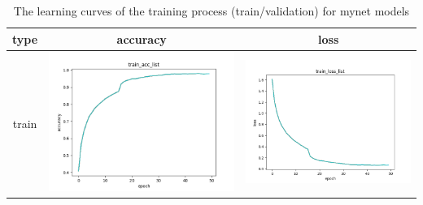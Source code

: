 \documentclass[a4paper, 12pt]{article}
\begin{document}
\begin{table}[!htb]
  \centering
  \caption{The learning curves of the training process (train/validation) for mynet models}
  \begin{tabular}{|c|c|c|}
    \hline
    type  & accuracy                                                                                               & loss                                                                                                    \\
    \hline
    train & \includegraphics[scale=0.5]{p2/experiment/mynet_2024_04_14_21_58_22_sgd_pre_da/log/train_acc_list.png} & \includegraphics[scale=0.5]{p2/experiment/mynet_2024_04_14_21_58_22_sgd_pre_da/log/train_loss_list.png} \\

\end{tabular}
\end{table}
\end{document}
